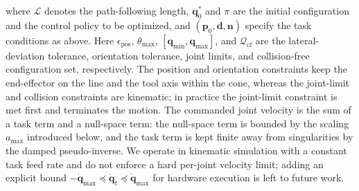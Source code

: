 \documentclass[journal, twoside]{IEEEtran}
\newcommand{\rst}[1]{{\color{rstcolor}#1}}
\begin{document}
where $\mathcal{L}$ denotes the path-following length, $\mathbf{q}_0^*$ and $\pi$ are the initial configuration and the control policy to be optimized, and $(\mathbf{p}_0, \mathbf{d}, \mathbf{n})$ specify the task conditions as above. Here $\epsilon_{\text{pos}}$, $\theta_{\max}$, $[\mathbf{q}_{\min}, \mathbf{q}_{\max}]$, and $\mathcal{Q}_{\mathrm{cf}}$ are the lateral-deviation tolerance, orientation tolerance, joint limits, and collision-free configuration set, respectively. \rst{The position and orientation constraints keep the end-effector on the line and the tool axis within the cone, whereas the joint-limit and collision constraints are kinematic; in practice the joint-limit constraint is met first and terminates the motion. The commanded joint velocity is the sum of a task term and a null-space term: the null-space term is bounded by the scaling $a_{\max}$ introduced below, and the task term is kept finite away from singularities by the damped pseudo-inverse. We operate in kinematic simulation with a constant task feed rate and do not enforce a hard per-joint velocity limit; adding an explicit bound $-\dot{\mathbf{q}}_{\max}\preceq\dot{\mathbf{q}}_{t}\preceq\dot{\mathbf{q}}_{\max}$ for hardware execution is left to future work.}
\end{document}
